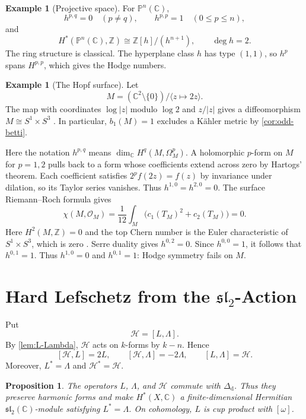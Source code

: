\documentclass[11pt,reqno]{amsart}
\newtheorem{proposition}[theorem]{Proposition}
\theoremstyle{definition}
\newtheorem{example}[theorem]{Example}
\theoremstyle{remark}
\newcommand{\C}{\mathbb{C}}
\newcommand{\Z}{\mathbb{Z}}
\newcommand{\PP}{\mathbb{P}}
\newcommand{\OO}{\mathcal{O}}
\newcommand{\dd}{\mathrm{d}}
\begin{document}
\begin{example}[Projective space]
\label{ex:pn}
For $\PP^n(\C)$,
\[
h^{p,q}=0\quad(p\neq q),
\qquad
h^{p,p}=1\quad(0\leq p\leq n),
\]
and
\[
H^*(\PP^n(\C),\Z)\cong\Z[h]/(h^{n+1}),
\qquad \deg h=2.
\]
The ring structure is classical. The hyperplane class $h$ has type $(1,1)$,
so $h^p$ spans $H^{p,p}$, which gives the Hodge numbers.
\end{example}

\begin{example}[The Hopf surface]
\label{ex:hopf}
Let
\[
M=(\C^2\setminus\{0\})/\langle z\mapsto2z\rangle.
\]
The map with coordinates $\log|z|$ modulo $\log 2$ and $z/|z|$
gives a diffeomorphism $M\cong S^1\times S^3$ \cite[\S V.18]{bhpv2004}.
In particular, $b_1(M)=1$ excludes a K\"ahler metric by
\cref{cor:odd-betti}.

Here the notation $h^{p,q}$ means $\dim_{\C}H^q(M,\Omega_M^p)$.
A holomorphic $p$-form on $M$ for $p=1,2$ pulls back to a form whose
coefficients extend across zero by Hartogs' theorem. Each coefficient
satisfies $2^p f(2z)=f(z)$ by invariance under dilation, so its Taylor
series vanishes. Thus $h^{1,0}=h^{2,0}=0$. The surface Riemann--Roch
formula gives
\[
\chi(M,\OO_M)=\frac{1}{12}\int_M\bigl(c_1(T_M)^2+c_2(T_M)\bigr)=0.
\]
Here $H^2(M,\Z)=0$ and the top Chern number is the Euler characteristic
of $S^1\times S^3$, which is zero
\cite[\S5.1]{huybrechts2005complex}. Serre duality gives $h^{0,2}=0$.
Since $h^{0,0}=1$, it follows that $h^{0,1}=1$. Thus $h^{1,0}=0$ and
$h^{0,1}=1$: Hodge symmetry fails on $M$.
\end{example}

\section{Hard Lefschetz from the
\texorpdfstring{$\mathfrak{sl}_2$}{sl2}-Action}
\label{sec:hard-lefschetz}

Put
\[
\mathcal H=[L,\Lambda].
\]
By \cref{lem:L-Lambda}, $\mathcal H$ acts on $k$-forms by $k-n$. Hence
\[
[\mathcal H,L]=2L,
\qquad
[\mathcal H,\Lambda]=-2\Lambda,
\qquad
[L,\Lambda]=\mathcal H.
\]
Moreover, $L^*=\Lambda$ and $\mathcal H^*=\mathcal H$.

\begin{proposition}
\label{prop:lefschetz-preserves-harmonic}
The operators $L$, $\Lambda$, and $\mathcal H$ commute with $\Delta_\dd$. Thus
they preserve harmonic forms and make $H^*(X,\C)$ a finite-dimensional
Hermitian $\mathfrak{sl}_2(\C)$-module satisfying $L^*=\Lambda$. On cohomology,
$L$ is cup product with $[\omega]$.
\end{proposition}
\end{document}
